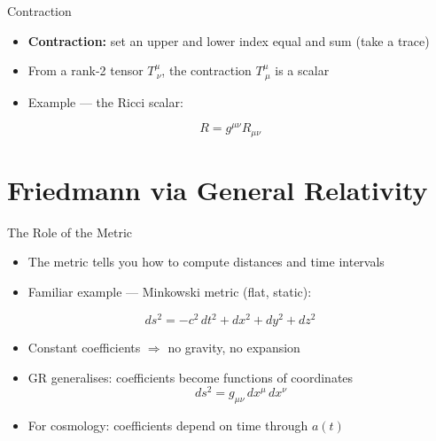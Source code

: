 \documentclass[aspectratio=169,11pt]{beamer}
\begin{document}
\begin{frame}{Contraction}
\begin{itemize}
    \item \textbf{Contraction:} set an upper and lower index equal and sum (take a trace)
    \item From a rank-2 tensor $T^\mu_{\ \nu}$, the contraction $T^\mu_{\ \mu}$ is a scalar
    \item Example --- the Ricci scalar:
\end{itemize}
\begin{equation*}
    R = g^{\mu\nu}R_{\mu\nu}
\end{equation*}
\vfill
\begin{center}
\end{center}
\end{frame}


\section{Friedmann via General Relativity}

\begin{frame}{The Role of the Metric}
\begin{itemize}
    \item The metric tells you how to compute distances and time intervals
    \item Familiar example --- Minkowski metric (flat, static):
\end{itemize}
\begin{equation*}
    ds^2 = -c^2\,dt^2 + dx^2 + dy^2 + dz^2
\end{equation*}
\begin{itemize}
    \item Constant coefficients $\Rightarrow$ no gravity, no expansion
    \item GR generalises: coefficients become functions of coordinates
\begin{equation*}
    ds^2 = g_{\mu\nu}\,dx^\mu\,dx^\nu
\end{equation*}
    \item For cosmology: coefficients depend on time through $a(t)$
\end{itemize}
\end{frame}
\end{document}
